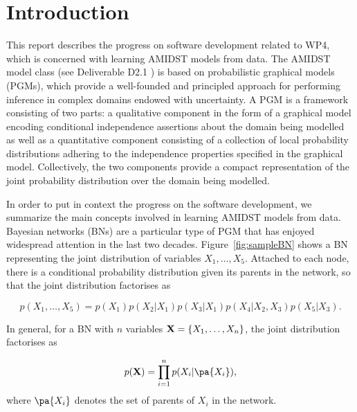 \section{Introduction}


This report describes the progress on software development related to WP4, which is concerned with
learning AMIDST models from data. The AMIDST  model class (see Deliverable D2.1 \cite{AMIDST-D21}) is based on 
probabilistic graphical models (PGMs), which provide a well-founded and principled approach for performing inference 
in complex domains endowed with uncertainty. A PGM is a framework consisting 
of two parts: a qualitative component in the form of a graphical model encoding conditional independence 
assertions about the domain being modelled as well as a quantitative component consisting of a collection of local 
probability distributions adhering to the independence properties specified in the graphical model. Collectively, the 
two components provide a compact representation of the joint probability distribution over the domain being modelled. 

In order to put in context the progress on the software development, we summarize the main concepts involved in
learning AMIDST models from data. 
Bayesian networks (BNs) \cite{Pearl88} are a particular type of
PGM that has enjoyed widespread attention in
the last two decades. Figure~\ref{fig:sampleBN} shows a BN representing
the joint distribution of variables $X_1,\ldots,X_5$. Attached to each node, there is a conditional probability
distribution given its parents in the network, so that the joint distribution factorises as

\[
p(X_1,\ldots,X_5) = p(X_1) p(X_2|X_1) p(X_3|X_1) p(X_4|X_2,X_3) p(X_5|X_3).
\]

In general, for a BN with $n$ variables $\bX=\{X_1,\ldots,X_n\}$, the joint distribution factorises as

\begin{equation}
\label{equ:factorisation}
p(\bX) = \prod_{i=1}^n p(X_i|\pa{X_i}) ,
\end{equation}
where $\pa{X_i}$ denotes the set of parents of $X_i$ in the network. 


\newcommand{\simpleModel}{    
      \node[obs] (X1) {$X_1$};
      \node[obs] (X2) [below left of=X1, xshift=-1.2cm, yshift=-1.2cm] {$X_2$};
      \node[obs] (X3) [below right of=X1, xshift=+1.2cm, yshift=-1.2cm] {$X_3$};
      \node[obs] (X4) [below right of=X2, xshift=+1.2cm, yshift=-1.2cm] {$X_4$};
      \node[obs] (X5) [below right of=X3, xshift=+1.2cm, yshift=-1.2cm] {$X_5$};
      \edge{X1}{X2};
      \edge{X1}{X3};
      \edge{X2,X3}{X4};
      \edge{X3}{X5};
    }
    
